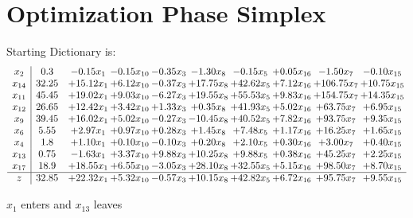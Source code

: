 \documentclass[9pt]{article}
\begin{document}
\section{Optimization Phase Simplex}
Starting Dictionary is:
\[\begin{array}{c| c c@{\hskip 2pt} c@{\hskip 2pt} c@{\hskip 2pt} c@{\hskip 2pt} c@{\hskip 2pt} c@{\hskip 2pt} c@{\hskip 2pt} c@{\hskip 2pt} }
 x_{2}   &  0.3 & -0.15 x_{1} & -0.15 x_{10} & -0.35 x_{3} & -1.30 x_{8} & -0.15 x_{5} & +  0.05 x_{16} & -1.50 x_{7} & -0.10 x_{15}\\
 x_{14}   &  32.25 & + 15.12 x_{1} & +  6.12 x_{10} & -0.37 x_{3} & + 17.75 x_{8} & + 42.62 x_{5} & +  7.12 x_{16} & + 106.75 x_{7} & + 10.75 x_{15}\\
 x_{11}   &  45.45 & + 19.02 x_{1} & +  9.03 x_{10} & -6.27 x_{3} & + 19.55 x_{8} & + 55.53 x_{5} & +  9.83 x_{16} & + 154.75 x_{7} & + 14.35 x_{15}\\
 x_{12}   &  26.65 & + 12.42 x_{1} & +  3.42 x_{10} & +  1.33 x_{3} & +  0.35 x_{8} & + 41.93 x_{5} & +  5.02 x_{16} & + 63.75 x_{7} & +  6.95 x_{15}\\
 x_{9}   &  39.45 & + 16.02 x_{1} & +  5.02 x_{10} & -0.27 x_{3} & -10.45 x_{8} & + 40.52 x_{5} & +  7.82 x_{16} & + 93.75 x_{7} & +  9.35 x_{15}\\
 x_{6}   &  5.55 & +  2.97 x_{1} & +  0.97 x_{10} & +  0.28 x_{3} & +  1.45 x_{8} & +  7.48 x_{5} & +  1.17 x_{16} & + 16.25 x_{7} & +  1.65 x_{15}\\
 x_{4}   &  1.8 & +  1.10 x_{1} & +  0.10 x_{10} & -0.10 x_{3} & +  0.20 x_{8} & +  2.10 x_{5} & +  0.30 x_{16} & +  3.00 x_{7} & +  0.40 x_{15}\\
 x_{13}   &  0.75 & -1.63 x_{1} & +  3.37 x_{10} & +  9.88 x_{3} & + 10.25 x_{8} & +  9.88 x_{5} & +  0.38 x_{16} & + 45.25 x_{7} & +  2.25 x_{15}\\
 x_{17}   &  18.9 & + 18.55 x_{1} & +  6.55 x_{10} & -3.05 x_{3} & + 28.10 x_{8} & + 32.55 x_{5} & +  5.15 x_{16} & + 98.50 x_{7} & +  8.70 x_{15}\\
\hline
z    &  32.85 & + 22.32 x_{1} & +  5.32 x_{10} & -0.57 x_{3} & + 10.15 x_{8} & + 42.82 x_{5} & +  6.72 x_{16} & + 95.75 x_{7} & +  9.55 x_{15}\\
\end{array}\]


 $ x_{1} $ enters and $ x_{13} $ leaves 
\end{document}
